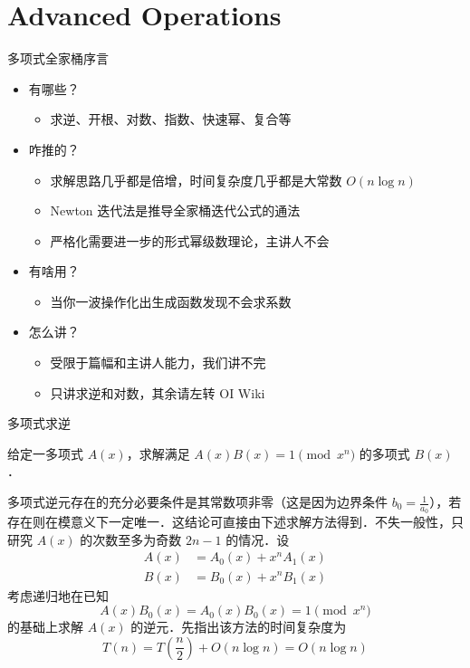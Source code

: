\documentclass[fontset=fandol]{ctexbeamer}
\begin{document}
\section{Advanced Operations}

\begin{frame}{多项式全家桶}{序言}
    \begin{itemize}
        \item 有哪些？
        \begin{itemize}
            \item 求逆、开根、对数、指数、快速幂、复合等
        \end{itemize}
        \item 咋推的？
        \begin{itemize}
            \item 求解思路几乎都是倍增，时间复杂度几乎都是大常数 $O(n \log n)$
            \item Newton 迭代法是推导全家桶迭代公式的通法
            \item 严格化需要进一步的形式幂级数理论，主讲人不会
        \end{itemize}
        \item 有啥用？
        \begin{itemize}
            \item 当你一波操作化出生成函数发现不会求系数
        \end{itemize}
        \item 怎么讲？
        \begin{itemize}
            \item 受限于篇幅和主讲人能力，我们讲不完
            \item 只讲求逆和对数，其余请左转 OI Wiki
        \end{itemize}
    \end{itemize}
\end{frame}

\begin{frame}{多项式求逆}

给定一多项式 $A(x)$，求解满足 $A(x) B(x) = 1 \pmod{x^{n}}$ 的多项式 $B(x)$．

多项式逆元存在的充分必要条件是其常数项非零（这是因为边界条件 $b_0 = \frac 1 {a_0}$），若存在则在模意义下一定唯一．这结论可直接由下述求解方法得到．不失一般性，只研究 $A(x)$ 的次数至多为奇数 $2n-1$ 的情况．设
\[
\begin{aligned}
A(x) &= A_0(x) + x^n A_1(x) \\
B(x) &= B_0(x) + x^n B_1(x)
\end{aligned}
\]
考虑递归地在已知
\[
A(x) B_0(x) = A_0(x) B_0(x) = 1 \pmod{x^n}
\]
的基础上求解 $A(x)$ 的逆元．先指出该方法的时间复杂度为
\[
T(n) = T(\frac n 2) + O(n \log n) = O(n \log n)
\]
\end{frame}
\end{document}
